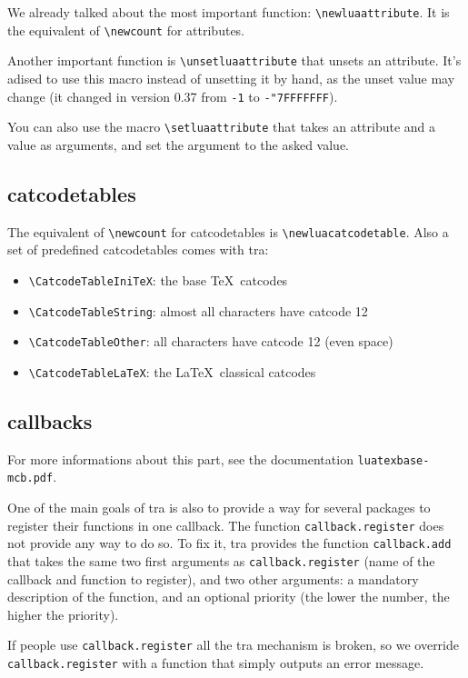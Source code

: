 \documentclass{article}
\newcommand\code{\texttt}
\begin{document}
We already talked about the most important function:
\verb+\newluaattribute+. It is the equivalent of
\verb+\newcount+ for attributes.

Another important function is \verb+\unsetluaattribute+ that unsets
an attribute. It's adised to use this macro instead of unsetting it by hand,
as the unset value may change (it changed in version 0.37 from \code{-1} to
\code{-"7FFFFFFF}).

You can also use the macro \verb+\setluaattribute+ that takes an
attribute and a value as arguments, and set the argument to the asked value.

\subsection{catcodetables}

The equivalent of \verb+\newcount+ for catcodetables is
\verb+\newluacatcodetable+. Also a set of predefined catcodetables
comes with \LuaTeX tra:

\begin{itemize}
  \item \verb+\CatcodeTableIniTeX+: the base \TeX\ catcodes
  \item \verb+\CatcodeTableString+: almost all characters have
    catcode 12
  \item \verb+\CatcodeTableOther+: all characters have catcode 12
    (even space)
  \item \verb+\CatcodeTableLaTeX+: the \LaTeX\ classical catcodes
\end{itemize}

\subsection{callbacks}

For more informations about this part, see the documentation
\code{luatexbase-mcb.pdf}.

One of the main goals of \LuaTeX tra is also to provide a way for several
packages to register their functions in one callback. The function
\code{callback.register} does not provide any way to do so. To fix it,
\LuaTeX tra provides the function \code{callback.add} that takes the same
two first arguments as \code{callback.register} (name of the callback and
function to register), and two other arguments: a mandatory description of the
function, and an optional priority (the lower the number, the higher the
priority).

If people use \code{callback.register} all the \LuaTeX tra mechanism is
broken, so we override \code{callback.register} with a function that simply
outputs an error message.
\end{document}
